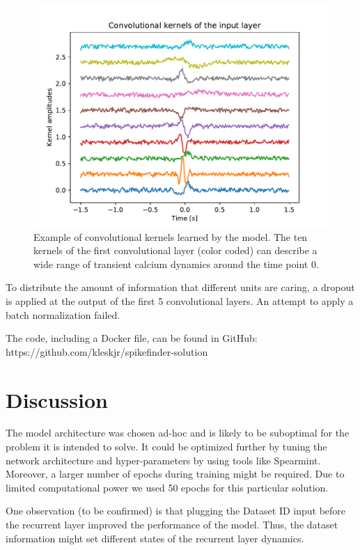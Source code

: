 \documentclass{article}
\begin{document}
\begin{figure}
  \centering
  \includegraphics[width=\textwidth]{input_kernels}
  \caption{Example of convolutional kernels learned by the model. The ten kernels of the first convolutional layer (color coded) can describe a wide range of transient calcium dynamics around the time point 0.}
\end{figure}

To distribute the amount of information that different units are caring, a
dropout is applied at the output of the first 5 convolutional layers. An
attempt to apply a batch normalization failed.

The code, including a Docker file, can be found in GitHub:\\ https://github.com/kleskjr/spikefinder-solution

\section*{Discussion}
The model architecture was chosen ad-hoc and is likely to be suboptimal for
the problem it is intended to solve. It could be optimized further by tuning
the network architecture and hyper-parameters by using tools like Spearmint. Moreover, a larger
number of epochs during training might be required. Due to limited computational power we used 50 epochs for
this particular solution.

One observation (to be confirmed) is that plugging the Dataset ID input before the recurrent layer improved the performance of the model. Thus, the dataset information might set different states of the recurrent layer dynamics.
\end{document}
